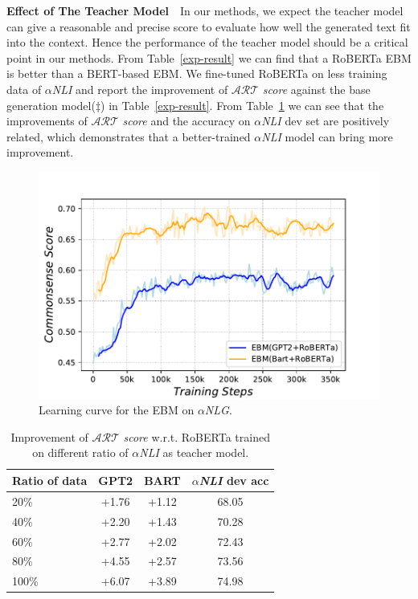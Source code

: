 \noindent\textbf{Effect of The Teacher Model}~~In our methods, we expect the teacher model can give a reasonable
and precise score to evaluate how well the generated text fit into the context. Hence the performance of the
teacher model should be a critical point in our methods. From Table~\ref{exp-result} we can find that a RoBERTa EBM
is better than a BERT-based EBM. We fine-tuned RoBERTa on less training data of
$\alpha$\textit{NLI} and report the improvement of $\mathcal{ART}$ \textit{score} against the base generation
model($\ddagger$) in Table~\ref{exp-result}. From Table~\ref{data-ratio-test} we can see that the improvements 
of $\mathcal{ART}$ \textit{score} and the accuracy on $\alpha$\textit{NLI}
dev set are positively related, which demonstrates that a better-trained $\alpha$\textit{NLI} model can bring more improvement.
\begin{figure}[t]
    \centering
    \includegraphics[width=1.0\columnwidth]{figs/learning_curve.pdf}
    \caption{Learning curve for the EBM on $\alpha$\textit{NLG}. 
    }
    \label{fig:learning_curve}
\end{figure}
\begin{table}[ht]
\small
\centering
\begin{tabular}{lccc}
\toprule
Ratio of data & \multicolumn{1}{l}{GPT2} & \multicolumn{1}{l}{BART} & \multicolumn{1}{l}{$\alpha$\textit{NLI} dev acc} \\ \midrule
20\% & +1.76 & +1.12 & 68.05 \\
40\% & +2.20 & +1.43 & 70.28 \\
60\% & +2.77 & +2.02 & 72.43 \\
80\% & +4.55 & +2.57 & 73.56 \\
100\% & +6.07 & +3.89 & 74.98 \\ \toprule
\end{tabular}
\caption{Improvement of $\mathcal{ART}$ \textit{score} w.r.t. RoBERTa trained on different ratio of $\alpha$\textit{NLI} as teacher model.}
\label{data-ratio-test}
\end{table}
